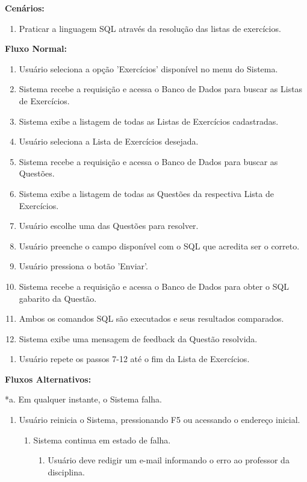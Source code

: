 \documentclass[graduacao,brazil]{ThesisPUC}
\begin{document}
\textbf{Cen\'{a}rios:}

\begin{enumerate}
  \item Praticar a linguagem SQL atrav\'{e}s da resolu\c{c}\~{a}o das listas de exerc\'{i}cios.
\end{enumerate}

\textbf{Fluxo Normal:}

\begin{enumerate}
  \item Usu\'{a}rio seleciona a opção 'Exerc\'{i}cios' dispon\'{i}vel no menu do Sistema.
  \item Sistema recebe a requisi\c{c}\~{a}o e acessa o Banco de Dados para buscar as Listas de Exerc\'{i}cios.
  \item Sistema exibe a listagem de todas as Listas de Exerc\'{i}cios cadastradas.
  \item Usu\'{a}rio seleciona a Lista de Exerc\'{i}cios desejada.
  \item Sistema recebe a requisi\c{c}\~{a}o e acessa o Banco de Dados para buscar as Quest\~{o}es.
  \item Sistema exibe a listagem de todas as Quest\~{o}es da respectiva Lista de Exerc\'{i}cios.
  \item Usu\'{a}rio escolhe uma das Quest\~{o}es para resolver.
  \item Usu\'{a}rio preenche o campo dispon\'{i}vel com o SQL que acredita ser o correto.
  \item Usu\'{a}rio pressiona o bot\~{a}o 'Enviar'.
  \item Sistema recebe a requisi\c{c}\~{a}o e acessa o Banco de Dados para obter o SQL gabarito da Quest\~{a}o.
  \item Ambos os comandos SQL s\~{a}o executados e seus resultados comparados.
  \item Sistema exibe uma mensagem de feedback da Quest\~{a}o resolvida.
\end{enumerate}

\begin{enumerate}[I]
  \item Usu\'{a}rio repete os passos 7-12 at\'{e} o fim da Lista de Exerc\'{i}cios.
\end{enumerate}

\textbf{Fluxos Alternativos:}

*a. Em qualquer instante, o Sistema falha.

\begin{enumerate}
  \item Usu\'{a}rio reinicia o Sistema, pressionando F5 ou acessando o endere\c{c}o inicial.
  \begin{enumerate}
    \item Sistema continua em estado de falha.
    \begin{enumerate}
      \item Usu\'{a}rio deve redigir um e-mail informando o erro ao professor da disciplina.
    \end{enumerate}
  \end{enumerate}
\end{enumerate}
\end{document}
